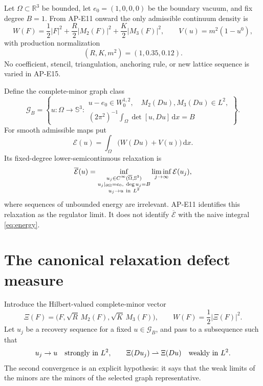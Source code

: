 \documentclass[11pt]{article}
\newcommand{\dd}{\,\mathrm d}
\newcommand{\RR}{\mathbb R}
\newcommand{\SSS}{\mathbb S}
\newcommand{\cE}{\mathcal E}
\newcommand{\cG}{\mathcal G}
\begin{document}
Let $\Omega\subset\RR^3$ be bounded, let $e_0=(1,0,0,0)$ be the boundary
vacuum, and fix degree $B=1$.  From AP-E11 onward the only admissible
continuum density is
\begin{equation}
 W(F)=\frac12|F|^2+\frac R2|M_2(F)|^2
      +\frac K2|M_3(F)|^2,\qquad
 V(u)=m^2(1-u^0),
 \label{eq:frozen-density}
\end{equation}
with production normalization
\begin{equation}
 \boxed{(R,K,m^2)=(1,0.35,0.12).}
 \label{eq:production}
\end{equation}
No coefficient, stencil, triangulation, anchoring rule, or new lattice
sequence is varied in AP-E15.

Define the complete-minor graph class
\begin{equation}
 \cG_B=\left\{u:\Omega\to\SSS^3:
 \begin{array}{l}
 u-e_0\in W^{1,2}_0,\quad M_2(Du),M_3(Du)\in L^2,\\
 (2\pi^2)^{-1}\int_\Omega\det[u,Du]\dd x=B
 \end{array}\right\}.
 \label{eq:graph-class}
\end{equation}
For smooth admissible maps put
\begin{equation}
 \cE(u)=\int_\Omega\bigl(W(Du)+V(u)\bigr)\dd x.
 \label{eq:energy}
\end{equation}
Its fixed-degree lower-semicontinuous relaxation is
\begin{equation}
 \overline{\cE}(u)=
 \inf_{\substack{u_j\in C^\infty(\overline\Omega,\SSS^3)\\
                  u_j|_{\partial\Omega}=e_0,\ \deg u_j=B\\
                  u_j\to u\ {\rm in}\ L^2}}
 \liminf_{j\to\infty}\cE(u_j),
 \label{eq:relaxation}
\end{equation}
where sequences of unbounded energy are irrelevant.  AP-E11 identifies this
relaxation as the regulator limit.  It does not identify
$\overline{\cE}$ with the naive integral \eqref{eq:energy}.

\section{The canonical relaxation defect measure}

Introduce the Hilbert-valued complete-minor vector
\begin{equation}
 \Xi(F)=\bigl(F,\sqrt R\,M_2(F),\sqrt K\,M_3(F)\bigr),
 \qquad W(F)=\frac12|\Xi(F)|^2.
 \label{eq:Xi}
\end{equation}
Let $u_j$ be a recovery sequence for a fixed $u\in\cG_B$, and pass to a
subsequence such that
\begin{equation}
 u_j\to u\quad\hbox{strongly in }L^2,\qquad
 \Xi(Du_j)\rightharpoonup\Xi(Du)\quad\hbox{weakly in }L^2.
 \label{eq:graph-weak}
\end{equation}
The second convergence is an explicit hypothesis: it says that the weak
limits of the minors are the minors of the selected graph representative.
\end{document}
